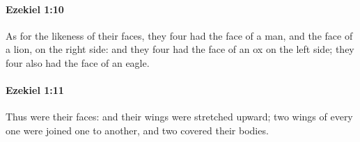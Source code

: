 		\paragraph{Ezekiel 1:10} %
			\label{EZEKIEL-1-10}

			As for the likeness of their faces, they four had the face of a man, and the face of a lion, on the right side: and they four had the face of an ox on the left side; they four also had the face of an eagle.


		\paragraph{Ezekiel 1:11} %
			\label{EZEKIEL-1-11}

			Thus were their faces: and their wings were stretched upward; two wings of every one were joined one to another, and two covered their bodies.


